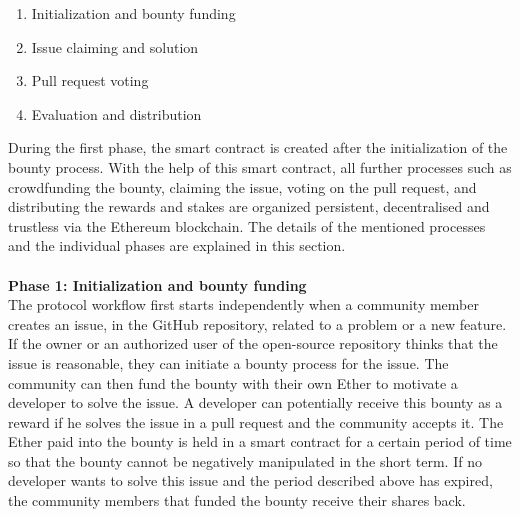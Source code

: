 \documentclass[sigconf]{acmart}
\begin{document}
\begin{enumerate}
  \item Initialization and bounty funding
  \item Issue claiming and solution
  \item Pull request voting
  \item Evaluation and distribution \\
\end{enumerate}
During the first phase, the smart contract is created after the initialization of the bounty process. With the help of this smart contract, 
all further processes such as crowdfunding the bounty, claiming the issue, voting on the pull request, and distributing the rewards and 
stakes are organized persistent, decentralised and trustless via the Ethereum blockchain. The details of the mentioned processes and 
the individual phases are explained in this section. \\ \\
\textbf{Phase 1: Initialization and bounty funding} \\
The protocol workflow first starts independently when a community member creates an issue, in the GitHub repository, 
related to a problem or a new feature. If the owner or an authorized user of the open-source repository thinks that the issue 
is reasonable, they can initiate a bounty process for the issue. The community can then fund the bounty with their own Ether
 to motivate a developer to solve the issue. A developer can potentially receive this bounty as a reward  if he solves the 
issue in a pull request and the community accepts it. The Ether paid into the bounty is held in a smart contract for a certain 
period of time so that the bounty cannot be negatively manipulated in the short term. If no developer wants to solve this issue
and the period described above has expired, the community members that funded the bounty receive their shares back. \\ \\
\end{document}
